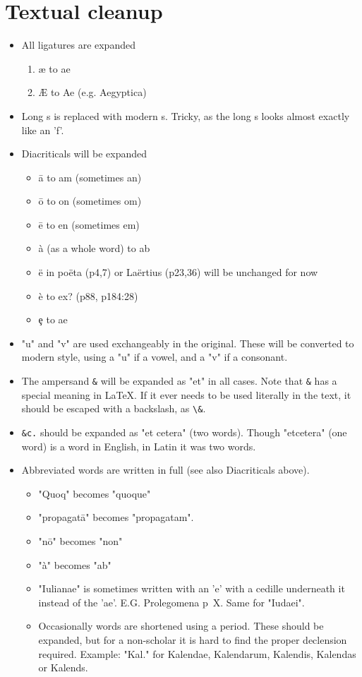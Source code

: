 \documentclass{report}
\begin{document}
\section{Textual cleanup}
\label{sec:textual_cleanup}
\begin{itemize}
\item All ligatures are expanded
	\begin{enumerate}
	\item æ to ae
	\item Æ to Ae (e.g. Aegyptica)
	\end{enumerate}

\item Long s is replaced with modern s. Tricky, as the long s looks almost
exactly like an 'f'.

\item Diacriticals will be expanded
	\begin{itemize}
	\item ā to am (sometimes an)
	\item ō to on (sometimes om)
	\item ē to en (sometimes em)
	\item à (as a whole word) to ab
	\item ë in poëta (p4,7) or Laërtius (p23,36) will be unchanged for now
	\item è to ex? (p88, p184:28)
	\item ȩ to ae
	\end{itemize}

\item "u" and "v" are used exchangeably in the original.
These will be converted to modern style,
 using a "u" if a vowel, and a "v" if a consonant.

\item The ampersand \verb+&+ will be expanded as "et" in all cases.
 Note that \verb+&+ has a special meaning in \LaTeX. If it ever needs to be
 used literally in the text, it should be escaped with a backslash, as
 \verb+\&+.

\item \verb+&c.+ should be expanded as "et cetera" (two words). Though
 "etcetera" (one word) is a word in English, in Latin it was two words.

\item Abbreviated words are written in full
 (see also Diacriticals above).
	\begin{itemize}
	\item "Quoq" becomes "quoque"
	\item "propagatā" becomes "propagatam".
	\item "nō" becomes "non"
	\item "à" becomes "ab"
	\item "Iulianae" is sometimes written with an 'e' with a cedille underneath
	 it instead of the 'ae'. E.G. Prolegomena p~X.
	 Same for "Iudaei".
	\item Occasionally words are shortened using a period. These should be
	expanded, but for a non-scholar it is hard to find the proper declension
	required.
	Example: "Kal." for Kalendae, Kalendarum, Kalendis, Kalendas or Kalends.
	\end{itemize}


\end{itemize}
\end{document}
